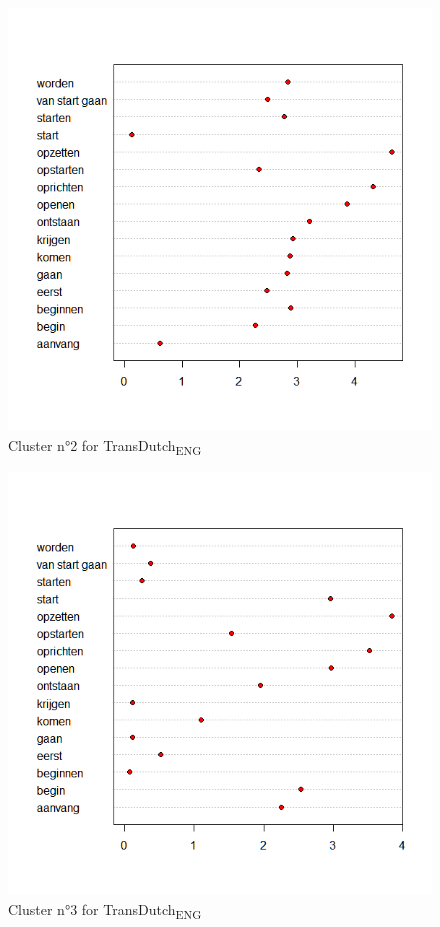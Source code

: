 \begin{figure}
\includegraphics[height=.4\textheight]{figures/Vandevoorde2-img70.png}
\caption{\label{fig:4:68}  Cluster n°2 for TransDutch\textsubscript{ENG}}
\end{figure}

\begin{figure}
\includegraphics[height=.4\textheight]{figures/Vandevoorde2-img71.png}
\caption{\label{fig:4:69}  Cluster n°3 for TransDutch\textsubscript{ENG}}
\end{figure}

